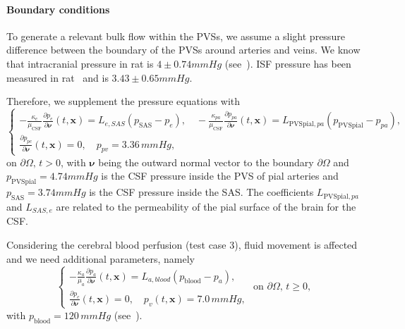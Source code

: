\documentclass[10pt]{article}
\newcommand{\ie}{\emph{i.e.}\;}
\newcommand{\1}{^{(1)}}
\newcommand{\2}{^{(2)}}
\begin{document}
\paragraph{Boundary conditions}
To generate a relevant bulk flow within the PVSs, we assume a slight pressure difference between the boundary of the PVSs around arteries and veins.
We know that intracranial pressure in rat is $4 \pm 0.74 \si{mmHg}$ (see~\cite{Roy-rat-pressure-2013}). 
ISF pressure has been measured in rat~\cite{Wiig-1983-interstitial} and is $3.43 \pm 0.65  \si{mmHg}$.


Therefore, we supplement the pressure equations with
\begin{equation}
\begin{cases}
    - \frac{\kappa_e}{\mu_\text{CSF}}\frac{\partial p_e}{\partial \pmb{\nu}}(t,\mathbf{x}) = L_{e , SAS}(p_\text{SAS}-p_{e}),\quad -\frac{\kappa_{pa}}{\mu_\text{CSF}}\frac{\partial p_{pa}}{\partial \pmb{ \nu}}(t,\mathbf x)  = L_{\text{PVSpial},pa}(p_{\text{PVSpial}}-p_{pa}), \\
    \frac{\partial p_{pc}}{\partial \pmb{\nu}}(t,\mathbf x) = 0, \quad p_{pv} = 3.36\, \si{mmHg},  %
\end{cases}
\label{eq:BC-4compsPVS}
\end{equation}
$\text{on } \partial \Omega,\, t>0$, with $\pmb{\nu}$ being the outward normal vector to the boundary $\partial \Omega$ and $p_\text{PVSpial} = 4.74\si{mmHg} $ is the CSF pressure inside the PVS of pial arteries and $p_\text{SAS} = 3.74 \si{mmHg} $ is the CSF pressure inside the SAS. The coefficients $L_{\text{PVSpial},pa}$ and $L_{SAS , e}$ are related to the permeability of the pial surface of the brain for the CSF.

Considering the cerebral blood perfusion (test case 3), fluid movement is affected and we need additional parameters, namely
\begin{equation}
\begin{cases}
    -\frac{\kappa_{a}}{\mu_{a}}\frac{\partial p_{a}}{\partial \pmb{\nu}}(t,\mathbf x)  = L_{a , blood}(p_\text{blood}-p_{a}), \\
    \frac{\partial p_{c}}{\partial \pmb{\nu}}(t,\mathbf x) = 0, \quad p_{v}(t,\mathbf x) = 7.0\, \si{mmHg}, 
\end{cases}
\text{ on } \partial \Omega, \, t\ge 0,
    \label{eq:BC-4compsblood}
\end{equation}
with $p_\text{blood} = 120 \, \si{mmHg}$ (see~\cite{hernandez1978cerebral}). 
\end{document}
